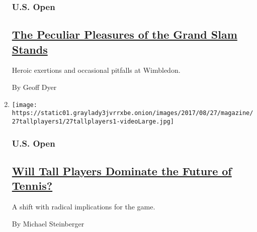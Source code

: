 \begin{enumerate}
  \hypertarget{us-open-2}{%
  \subsubsection{U.S. Open}\label{us-open-2}}

  \hypertarget{the-peculiar-pleasures-of-the-grand-slam-stands}{%
  \subsection{\texorpdfstring{\href{/interactive/2017/08/24/magazine/usopen-grand-slam-wimbledon-pleasures-pitfalls.html}{The
  Peculiar Pleasures of the Grand Slam
  Stands}}{The Peculiar Pleasures of the Grand Slam Stands}}\label{the-peculiar-pleasures-of-the-grand-slam-stands}}

  Heroic exertions and occasional pitfalls at Wimbledon.

  By Geoff Dyer
\item
  \texttt{[image: https://static01.graylady3jvrrxbe.onion/images/2017/08/27/magazine/27tallplayers1/27tallplayers1-videoLarge.jpg]}

  \hypertarget{us-open-3}{%
  \subsubsection{U.S. Open}\label{us-open-3}}

  \hypertarget{will-tall-players-dominate-the-future-of-tennis}{%
  \subsection{\texorpdfstring{\href{/interactive/2017/08/24/magazine/usopen-tall-players-zverev-tennis-future.html}{Will
  Tall Players Dominate the Future of
  Tennis?}}{Will Tall Players Dominate the Future of Tennis?}}\label{will-tall-players-dominate-the-future-of-tennis}}

  A shift with radical implications for the game.

  By Michael Steinberger
\end{enumerate}

